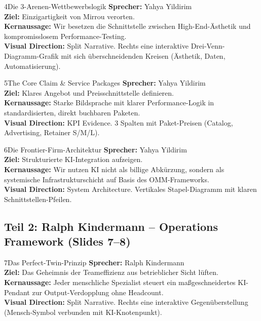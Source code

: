 \documentclass[11pt,a4paper]{article}
\begin{document}
\begin{slidebox}{4}{Die 3-Arenen-Wettbewerbslogik}
    \textbf{Sprecher:} Yahya Yildirim \\
    \textbf{Ziel:} Einzigartigkeit von Mirrou verorten.\\
    \textbf{Kernaussage:} Wir besetzen die Schnittstelle zwischen High-End-Ästhetik und kompromisslosem Performance-Testing.\\
    \textbf{Visual Direction:} Split Narrative. Rechts eine interaktive Drei-Venn-Diagramm-Grafik mit sich überschneidenden Kreisen (Ästhetik, Daten, Automatisierung).
\end{slidebox}

\begin{slidebox}{5}{The Core Claim \& Service Packages}
    \textbf{Sprecher:} Yahya Yildirim \\
    \textbf{Ziel:} Klares Angebot und Preisschnittstelle definieren.\\
    \textbf{Kernaussage:} Starke Bildsprache mit klarer Performance-Logik in standardisierten, direkt buchbaren Paketen.\\
    \textbf{Visual Direction:} KPI Evidence. 3 Spalten mit Paket-Preisen (Catalog, Advertising, Retainer S/M/L).
\end{slidebox}

\begin{slidebox}{6}{Die Frontier-Firm-Architektur}
    \textbf{Sprecher:} Yahya Yildirim \\
    \textbf{Ziel:} Strukturierte KI-Integration aufzeigen.\\
    \textbf{Kernaussage:} Wir nutzen KI nicht als billige Abkürzung, sondern als systemische Infrastrukturschicht auf Basis des OMM-Frameworks.\\
    \textbf{Visual Direction:} System Architecture. Vertikales Stapel-Diagramm mit klaren Schnittstellen-Pfeilen.
\end{slidebox}

\newpage
\subsection{Teil 2: Ralph Kindermann -- Operations Framework (Slides 7--8)}

\begin{slidebox}{7}{Das Perfect-Twin-Prinzip}
    \textbf{Sprecher:} Ralph Kindermann \\
    \textbf{Ziel:} Das Geheimnis der Teameffizienz aus betrieblicher Sicht lüften.\\
    \textbf{Kernaussage:} Jeder menschliche Spezialist steuert ein maßgeschneidertes KI-Pendant zur Output-Verdopplung ohne Headcount.\\
    \textbf{Visual Direction:} Split Narrative. Rechts eine interaktive Gegenüberstellung (Mensch-Symbol verbunden mit KI-Knotenpunkt).
\end{slidebox}
\end{document}
